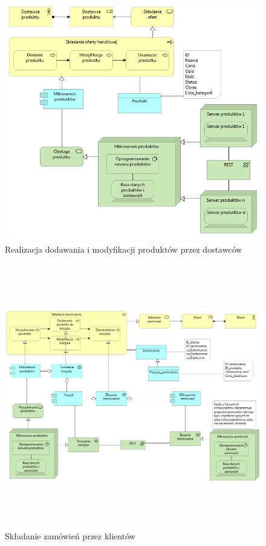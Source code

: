 \documentclass[11pt,a4paper,twoside]{article}
\begin{document}
\begin{figure}[ht]
\caption{Realizacja dodawania i modyfikacji produktów przez dostawców}
\label{dodawanieProduktu02}
\centering
\includegraphics[height=10.3cm, width=15.7cm]{02_produkt}
\end{figure}

\begin{figure}[ht]
\caption{Składanie zamówień przez klientów}
\label{skladanieZamowienia03}
\centering
\includegraphics[height=11.5cm, width=15.7cm]{03_zamowienie_skladanie}
\end{figure}
\end{document}
